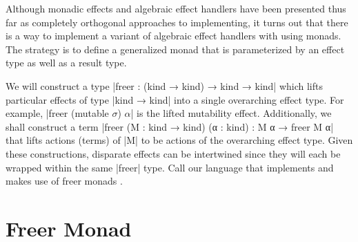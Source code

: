 Although monadic effects and algebraic effect handlers have been presented thus far as completely orthogonal approaches to implementing, it turns out that there is a way to implement a variant of algebraic effect handlers with \LangA using monads.
The strategy is to define a generalized monad that is parameterized by an effect type as well as a result type.

We will construct a type \code|freer : (kind → kind) → kind → kind| which lifts particular effects of type \code|kind → kind| into a single overarching effect type.
For example, \code|freer (mutable $σ$) $α$| is the lifted mutability effect.
Additionally, we shall construct a term \code|freer (M : kind → kind) (α : kind) : M α → freer M α| that lifts actions (terms) of \code|M| to be actions of the overarching effect type.
Given these constructions, disparate effects can be intertwined since they will each be wrapped within the same \code|freer| type.
Call our language that implements and makes use of freer monads \LangE.

\section{Freer Monad}


